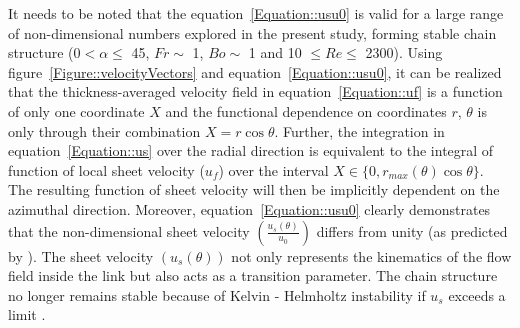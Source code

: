 \documentclass[%
 aip,
 sd,%
amsmath,amssymb,
preprint,%
author-year,%
]{revtex4-1}
\begin{document}
It needs to be noted that the equation~\ref{Equation::usu0} is valid for a large range of non-dimensional numbers explored in the present study, forming stable chain structure (0\degree $< \alpha \le$  45\degree, $Fr \sim$ 1, $Bo \sim$ 1 and 10 $\le Re \le$ 2300).  Using figure~\ref{Figure::velocityVectors} and equation~\ref{Equation::usu0}, it can be realized that the thickness-averaged velocity field in equation~\ref{Equation::uf} is a function of only one coordinate $X$ and the functional dependence on coordinates $r$, $\theta$ is only through their combination $X = r\cos\theta$. Further, the integration in equation~\ref{Equation::us} over the radial direction is equivalent to the integral of function of local sheet velocity ($u_f$) over the interval $X \in \{0, r_{max}(\theta)\cos\theta\}$. The resulting function of sheet velocity will then be implicitly dependent on the azimuthal direction. Moreover, equation~\ref{Equation::usu0} clearly demonstrates that the non-dimensional sheet velocity $\left(\frac{u_s(\theta)}{u_0}\right)$ differs from unity (as predicted by \cite{choo2002velocity}). The sheet velocity $\left(u_s(\theta)\right)$ not only represents the kinematics of the flow field inside the link but also acts as a transition parameter. The chain structure no longer remains stable because of Kelvin - Helmholtz instability if $u_s$ exceeds a limit \citep{villermaux2002life}.\\
\end{document}
